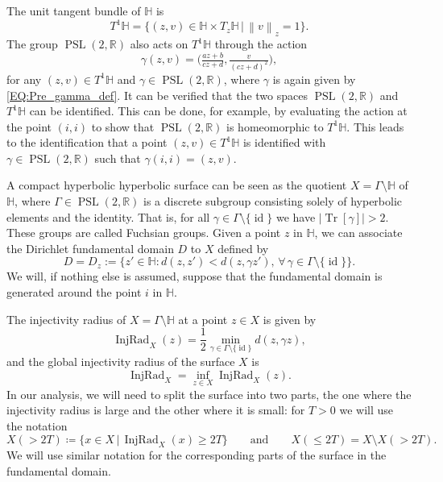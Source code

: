 \documentclass[11pt,twoside,reqno]{amsart}
\newcommand{\R}{\mathbb{R}}
\newcommand{\bH}{\mathbb{H}}
\newcommand{\1}{\mathrm{\mathbf{1}}}
\newcommand{\id}{\operatorname{id}}
\DeclareMathOperator{\Tr}{Tr}
\DeclareMathOperator{\InjRad}{InjRad}
\DeclareMathOperator{\PSL}{PSL}
\newcommand{\norm}[1]{\left\lVert#1\right\rVert}
\numberwithin{equation}{section}
\theoremstyle{plain}
\theoremstyle{definition}
\theoremstyle{remark}
\begin{document}
The unit tangent bundle of $\bH$ is 
\begin{equation*}
    T^1\bH = \big\{ (z,v) \in \bH \times T_z\bH \,|\, \norm{v}_z=1 \big\}.
\end{equation*}
The group $\PSL(2,\R)$ also acts on $T^1\bH$ through the action
\begin{equation*}
    \gamma (z,v) = \Big( \tfrac{az+b}{cz+d},\tfrac{v}{(cz+d)^2} \Big),
\end{equation*}
for any $(z,v)\in T^1\bH$ and $\gamma \in \PSL(2,\R)$, where $\gamma$ is again given by \eqref{EQ:Pre_gamma_def}. It can be verified that the two spaces $\PSL(2,\R)$ and $T^{1}\bH$ can be identified. This can be done, for example, by evaluating the action at the point $(i,i)$ to show that $\PSL(2,\R)$ is homeomorphic to $T^{1}\bH$. This leads to the identification that a point $(z,v)\in T^1\bH$ is identified with $\gamma\in \PSL(2,\R)$ such that $\gamma (i,i) = (z,v)$.

A compact hyperbolic hyperbolic surface can be seen as the quotient $ X=\Gamma\setminus \bH$ of $\bH$, where $\Gamma\in\PSL(2,\R)$ is a discrete subgroup consisting solely of hyperbolic elements and the identity. That is, for all $\gamma\in\Gamma\setminus\{\id\}$ we have $|\Tr[\gamma]|>2$. These groups are called Fuchsian groups. Given a point $z$ in $\bH$, we can associate the Dirichlet fundamental domain $D$ to $X$ defined by
\begin{equation*}
    D = D_z := \big\{ z'\in \bH : d(z,z') < d(z,\gamma z'), \, \forall \, \gamma \in \Gamma\setminus\{\id\}\big\}.
\end{equation*}
We will, if nothing else is assumed, suppose that the fundamental domain is generated around the point $i$ in $\bH$.

The injectivity radius of $X = \Gamma \setminus \bH$ at a point $z\in X $ is given by
\begin{equation*}
    \InjRad_X(z) = \frac{1}{2} \min_{\gamma\in\Gamma\setminus\{\id\}} d(z,\gamma z),
\end{equation*}
and the global injectivity radius of the surface $X$ is
\begin{equation*}
    \InjRad_X = \inf_{z\in X} \InjRad_X(z).
\end{equation*}
In our analysis, we will need to split the surface into two parts, the one where the injectivity radius is large and the other where it is small: for $T>0$ we will use the notation
\begin{equation*}
    X(> 2T) \coloneqq \{ x\in X \,|\, \InjRad_X(x) \geq 2T \} \qquad\text{and}\qquad X(\leq 2T) = X\setminus X(> 2T).
\end{equation*}
We will use similar notation for the corresponding parts of the surface in the fundamental domain. 
\end{document}
